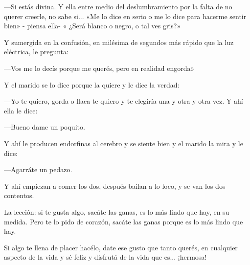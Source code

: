 \documentclass[11pt,twoside,openright,a5paper]{book}
\begin{document}
---Si estás divina. Y  ella entre medio del deslumbramiento por la falta de no querer creerle, no sabe si... «Me  lo dice en serio o me lo dice para hacerme sentir bien» - piensa ella- « ¿Será blanco o negro, o tal ves gris?»

Y sumergida en la confusión,  en milésima de segundos más rápido que la luz eléctrica, le pregunta:

---Vos me lo decís porque me querés,  pero en realidad engorda»

Y el marido se lo dice porque la quiere y le dice la verdad:

---Yo te quiero,  gorda o flaca te quiero y te elegiría  una y otra y otra vez. Y ahí ella le dice:

---Bueno dame un poquito.

Y ahí le producen endorfinas al cerebro y se siente bien y el marido la mira y le dice:

---Agarráte un pedazo.

Y ahí empiezan a comer los dos, después bailan a lo loco, y se van los dos contentos.

La lección: si te gusta algo, sacáte las  ganas,  es lo más lindo que hay,  en su medida. Pero te lo pido de corazón, sacáte las ganas porque es lo más lindo que hay.

Si algo te llena de placer hacélo, date ese gusto que tanto querés, en cualquier aspecto de la vida y sé feliz y disfrutá de la vida que es... ¡hermosa!
\end{document}
